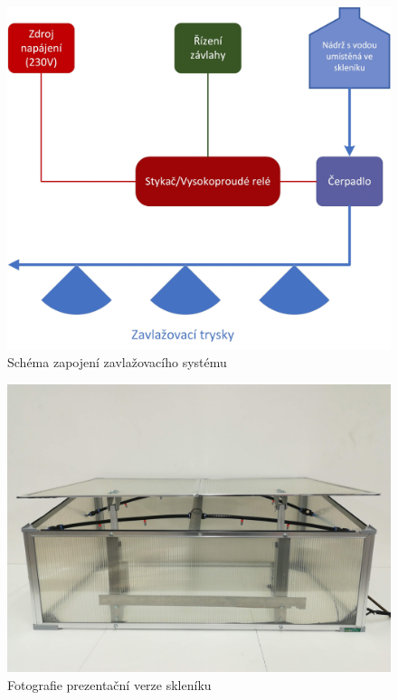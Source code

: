 \begin{figure}[htbp]
 	\includegraphics[width=\textwidth]{img/zavlazovani.jpg}
 	\caption{Schéma zapojení zavlažovacího systému}
 	\label{fig:zavlaha_schema} 
\end{figure}

\begin{figure}[htbp]
    \includegraphics[width=\textwidth]{img/miniSklenik.jpg}
    \caption{Fotografie prezentační verze skleníku}
    \label{fig:miniSklenik} 
\end{figure}

